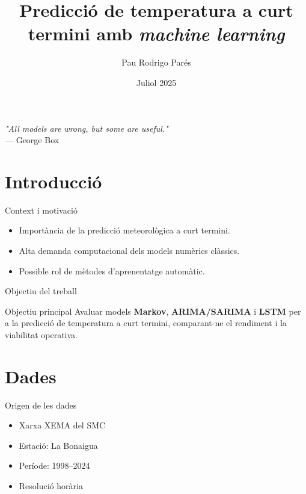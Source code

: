 \documentclass[mathserif, aspectratio=169]{beamer}
\title[Predicció temperatura amb ML]{Predicció de temperatura a curt termini amb \textit{machine learning}}
\author[Pau Rodrigo]{Pau Rodrigo Parés}
\institute[UAB, SMC]{Universitat Autònoma de Barcelona \\ Servei Meteorològic de Catalunya}
\date{Juliol 2025}
\begin{document}
\begin{frame}[plain]
  \titlepage
\end{frame}

\begin{frame}
  \centering
  \large
  \textit{"All models are wrong, but some are useful."} \\
  --- George Box
\end{frame}

\section{Introducció}

\begin{frame}{Context i motivació}
  \begin{itemize}
    \item Importància de la predicció meteorològica a curt termini.
    \item Alta demanda computacional dels models numèrics clàssics.
    \item Possible rol de mètodes d'aprenentatge automàtic.
  \end{itemize}
\end{frame}

\begin{frame}{Objectiu del treball}
  \begin{block}{Objectiu principal}
    Avaluar models \textbf{Markov}, \textbf{ARIMA/SARIMA} i \textbf{LSTM} per a la predicció de temperatura a curt termini, comparant-ne el rendiment i la viabilitat operativa.
  \end{block}
\end{frame}

\section{Dades}

\begin{frame}{Origen de les dades}
  \begin{itemize}
    \item Xarxa XEMA del SMC
    \item Estació: La Bonaigua
    \item Període: 1998--2024
    \item Resolució horària
  \end{itemize}
\end{frame}
\end{document}
